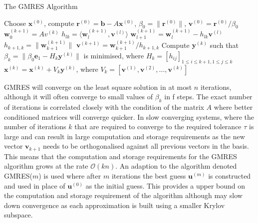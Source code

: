 \begin{algorithm}
\caption{The GMRES Algorithm}\label{alg:GMRES}
\begin{algorithmic}[1]
\State Choose $\bm{x}^{(0)}$, compute $\bm{r}^{(0)}=\bm{b}-A\bm{x}^{(0)}$, $\beta_0 = \lVert \bm{r}^{(0)} \rVert$, $\bm{v}^{(0)} = \bm{r}^{(0)}/\beta_0$
\State $\bm{w}_0^{(k+1)} = Av^{(k)}$
\State $h_{lk}=\langle \bm{w}_l^{(k+1)}, \bm{v}^{(l)} \rangle$
\State $\bm{w}_{l+1}^{(k+1)} = \bm{w}_l^{(k+1)} - h_{lk}\bm{v}^{(l)}$
\EndFor
\State $h_{k+1,k}=\lVert \bm{w}_{k+1}^{(k+1)} \rVert$
\State $\bm{v}^{(k+1)} = \bm{w}_{k+1}^{(k+1)}/h_{k+1,k}$
\State Compute $\bm{y}^{(k)}$ such that $\beta_k = \lVert \beta_0 \bm{e}_1 - H_k  \bm{y}^{(k)} \rVert$ is minimised, where
\State $H_k = [h_{ij}]_{1 \leq i \leq k+1, 1 \leq j \leq k}$
\EndFor
\State $\bm{x}^{(k)} = \bm{x}^{(k)} + V_k\bm{y}^{(k)}$, where $V_k = [\bm{v}^{(1)},\bm{v}^{(2)},\dots,\bm{v}^{(k)}]$
\end{algorithmic}
\end{algorithm}

GMRES will converge on the least square solution in at most $n$ iterations, although it will often converge to small values of $\beta_k$ in f steps. The exact number of iterations is correlated closely with the  condition of the matrix $A$ where better conditioned matrices will converge quicker. In slow converging systems, where the number of iterations $k$ that are required to converge to the required tolerance $\tau$ is large and can result in large computation and storage requirements as the new vector $\bm{v}_{k+1}$ needs to be orthogonalised against all previous vectors in the basis. This means that the computation and storage requirements for the GMRES algorithm grows at the rate $\mathcal{O}(kn)$. An adaption to the algorithm denoted GMRES($m$) is used where after $m$ iterations the best guess $\bm{u}^{(m)}$ is constructed and used in place of $\bm{u}^{(0)}$ as the initial guess. This provides a upper bound on the computation and storage requirement of the algorithm although may slow down convergence as each approximation is built using a smaller Krylov subspace.

\FloatBarrier

